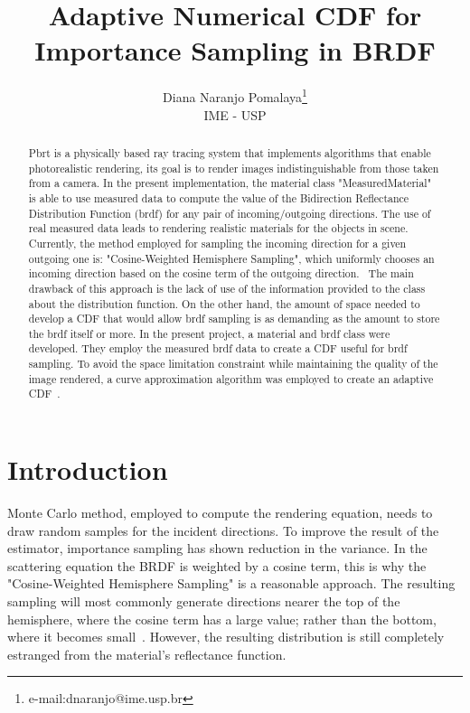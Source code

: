 \documentclass[conference]{acmsiggraph}
\title{Adaptive Numerical CDF for Importance Sampling in BRDF}
\author{Diana Naranjo Pomalaya\thanks{e-mail:dnaranjo@ime.usp.br}\\IME - USP}
\begin{document}

\maketitle

\begin{abstract}
Pbrt is a physically based ray tracing system that implements algorithms that enable photorealistic rendering, its goal is to render images indistinguishable from those taken from a camera. In the present implementation, the material class "MeasuredMaterial" is able to use measured data to compute the value of the Bidirection Reflectance Distribution Function (brdf) for any pair of incoming/outgoing directions. The use of real measured data leads to rendering realistic materials for the objects in scene. Currently, the method employed for sampling the incoming direction for a given outgoing one is: "Cosine-Weighted Hemisphere Sampling", which uniformly chooses an incoming direction based on the cosine term of the outgoing direction.~\cite{Pharr:2010:PBR} The main drawback of this approach is the lack of use of the information provided to the class about the distribution function. On the other hand, the amount of space needed to develop a CDF that would allow brdf sampling is as demanding as the amount to store the brdf itself or more. In the present project, a material and brdf class were developed. They employ the measured brdf data to create a CDF useful for brdf sampling. To avoid the space limitation constraint while maintaining the quality of the image rendered, a curve approximation algorithm was employed to create an adaptive CDF~\cite{Lawrence:2005:ANC}.
\end{abstract}

\copyrightspace

\section{Introduction}
Monte Carlo method, employed to compute the rendering equation, needs to draw random samples for the incident directions. To improve the result of the estimator, importance sampling has shown reduction in the variance. In the scattering equation the BRDF is weighted by a cosine term, this is why the "Cosine-Weighted Hemisphere Sampling" is a reasonable approach. The resulting sampling will most commonly generate directions nearer the top of the hemisphere, where the cosine term has a large value; rather than the bottom, where it becomes small~\cite{Pharr:2010:PBR}. However, the resulting distribution is still completely estranged from the material's reflectance function.
\end{document}
